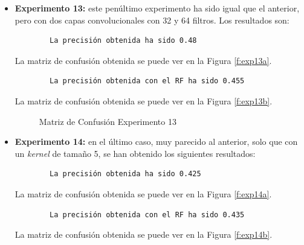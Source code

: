\begin{itemize}
    \item \textbf{Experimento 13:} este penúltimo experimento ha sido igual que el anterior, pero con dos capas convolucionales con 32 y 64 filtros. Los resultados son:
    \begin{verbatim}
        La precisión obtenida ha sido 0.48
    \end{verbatim}
    La matriz de confusión obtenida se puede ver en la Figura \ref{f:exp13a}.
    \begin{verbatim}
        La precisión obtenida con el RF ha sido 0.455
    \end{verbatim}
    La matriz de confusión obtenida se puede ver en la Figura \ref{f:exp13b}.
    \begin{figure}[h]
     \centering
     \caption{Matriz de Confusión Experimento 13}
     \label{f:exp13}
    \end{figure}
    \newpage
    \item \textbf{Experimento 14:} en el último caso, muy parecido al anterior, solo que con un \emph{kernel} de tamaño 5, se han obtenido los siguientes resultados:
    \begin{verbatim}
        La precisión obtenida ha sido 0.425
    \end{verbatim}
    La matriz de confusión obtenida se puede ver en la Figura \ref{f:exp14a}.
    \begin{verbatim}
        La precisión obtenida con el RF ha sido 0.435
    \end{verbatim}
    La matriz de confusión obtenida se puede ver en la Figura \ref{f:exp14b}.
    \begin{figure}[h]
     \centering

\end{figure}
\end{itemize}
